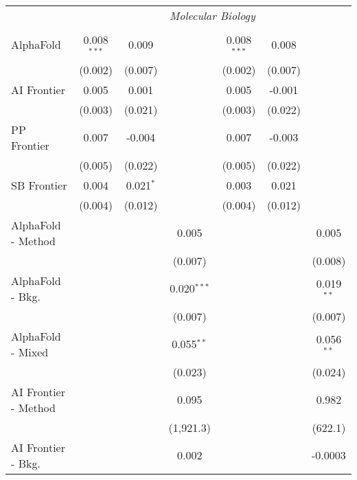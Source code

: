 \begin{tabular}{lcccccc}
 & \multicolumn{6}{c}{\textit{Molecular Biology}} \\ \\
   AlphaFold            & 0.008$^{***}$ & 0.009       &                & 0.008$^{***}$ & 0.008   &   \\   
                        & (0.002)       & (0.007)     &                & (0.002)       & (0.007) &   \\   
   AI Frontier          & 0.005         & 0.001       &                & 0.005         & -0.001  &   \\   
                        & (0.003)       & (0.021)     &                & (0.003)       & (0.022) &   \\   
   PP Frontier          & 0.007         & -0.004      &                & 0.007         & -0.003  &   \\   
                        & (0.005)       & (0.022)     &                & (0.005)       & (0.022) &   \\   
   SB Frontier          & 0.004         & 0.021$^{*}$ &                & 0.003         & 0.021   &   \\   
                        & (0.004)       & (0.012)     &                & (0.004)       & (0.012) &   \\   
   AlphaFold - Method   &               &             & 0.005          &               &         & 0.005\\   
                        &               &             & (0.007)        &               &         & (0.008)\\   
   AlphaFold - Bkg.     &               &             & 0.020$^{***}$  &               &         & 0.019$^{**}$\\   
                        &               &             & (0.007)        &               &         & (0.007)\\   
   AlphaFold - Mixed    &               &             & 0.055$^{**}$   &               &         & 0.056$^{**}$\\   
                        &               &             & (0.023)        &               &         & (0.024)\\   
   AI Frontier - Method &               &             & 0.095          &               &         & 0.982\\   
                        &               &             & (1,921.3)      &               &         & (622.1)\\   
   AI Frontier - Bkg.   &               &             & 0.002          &               &         & -0.0003\\   

\end{tabular}
